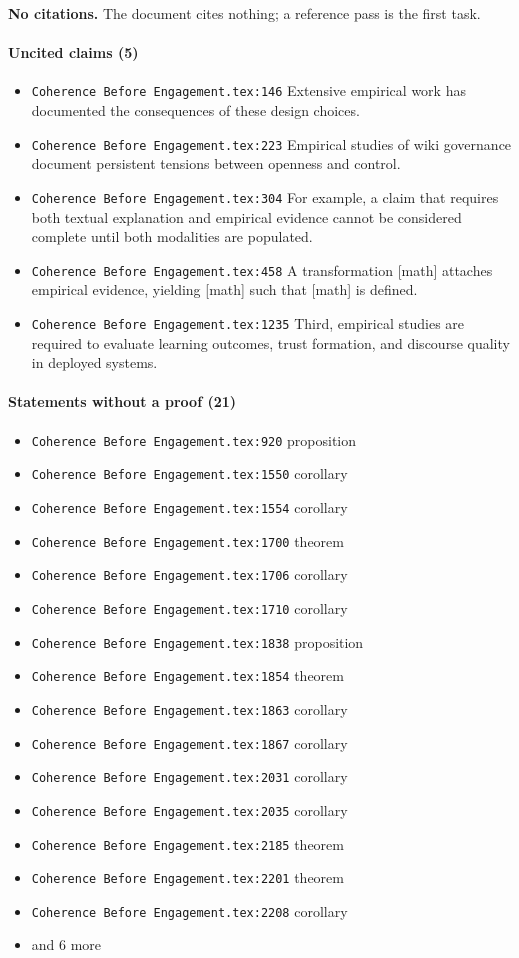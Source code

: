 \documentclass[11pt]{article}
\newcommand{\loc}[1]{{\small\color{muted}\texttt{#1}}}
\begin{document}
\textbf{No citations.} The document cites nothing; a reference pass is the first task.

\paragraph{Uncited claims (5)}
\begin{itemize}
\item \loc{Coherence Before Engagement.tex:146} Extensive empirical work has documented the consequences of these design choices.
\item \loc{Coherence Before Engagement.tex:223} Empirical studies of wiki governance document persistent tensions between openness and control.
\item \loc{Coherence Before Engagement.tex:304} For example, a claim that requires both textual explanation and empirical evidence cannot be considered complete until both modalities are populated.
\item \loc{Coherence Before Engagement.tex:458} A transformation [math] attaches empirical evidence, yielding [math] such that [math] is defined.
\item \loc{Coherence Before Engagement.tex:1235} Third, empirical studies are required to evaluate learning outcomes, trust formation, and discourse quality in deployed systems.
\end{itemize}
\paragraph{Statements without a proof (21)}
\begin{itemize}
\item \loc{Coherence Before Engagement.tex:920} proposition
\item \loc{Coherence Before Engagement.tex:1550} corollary
\item \loc{Coherence Before Engagement.tex:1554} corollary
\item \loc{Coherence Before Engagement.tex:1700} theorem
\item \loc{Coherence Before Engagement.tex:1706} corollary
\item \loc{Coherence Before Engagement.tex:1710} corollary
\item \loc{Coherence Before Engagement.tex:1838} proposition
\item \loc{Coherence Before Engagement.tex:1854} theorem
\item \loc{Coherence Before Engagement.tex:1863} corollary
\item \loc{Coherence Before Engagement.tex:1867} corollary
\item \loc{Coherence Before Engagement.tex:2031} corollary
\item \loc{Coherence Before Engagement.tex:2035} corollary
\item \loc{Coherence Before Engagement.tex:2185} theorem
\item \loc{Coherence Before Engagement.tex:2201} theorem
\item \loc{Coherence Before Engagement.tex:2208} corollary
\item[] {\color{muted}\small and 6 more}
\end{itemize}
\end{document}
